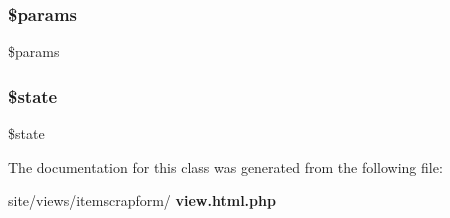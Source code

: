 \subsubsection{\$params}
{\footnotesize\ttfamily \$params\hspace{0.3cm}{\ttfamily [protected]}}

\mbox{\label{classtks__agenda_view_item_scrap_form_ae82306c4f2d17d8dd5c7d8d916b33bed}} 
\subsubsection{\$state}
{\footnotesize\ttfamily \$state\hspace{0.3cm}{\ttfamily [protected]}}



The documentation for this class was generated from the following file\+:\begin{DoxyCompactItemize}
\item 
site/views/itemscrapform/\textbf{ view.\+html.\+php}\end{DoxyCompactItemize}
